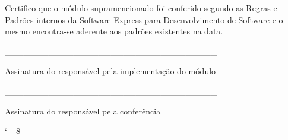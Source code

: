\documentclass[a4paper]{article}
\newcommand{\stopunderscoreletter}{\catcode`_ 8}
\begin{document}
\begin{flushleft}
 Certifico que o módulo supramencionado foi conferido segundo as Regras e Padrões internos da Software Express para Desenvolvimento de Software e o mesmo encontra-se aderente aos padrões existentes na data.
\newline
\newline
\newline
\newline

\end{flushleft}


\begin{flushright}
\_\_\_\_\_\_\_\_\_\_\_\_\_\_\_\_\_\_\_\_\_\_\_\_\_\_\_\_\_\_\_\_\_\_

Assinatura do responsável pela implementação do módulo
\end{flushright}

\begin{flushright}

\end{flushright}

\begin{flushright}
\_\_\_\_\_\_\_\_\_\_\_\_\_\_\_\_\_\_\_\_\_\_\_\_\_\_\_\_\_\_\_\_\_\_

Assinatura do responsável pela conferência
\end{flushright}
\stopunderscoreletter
\end{document}
